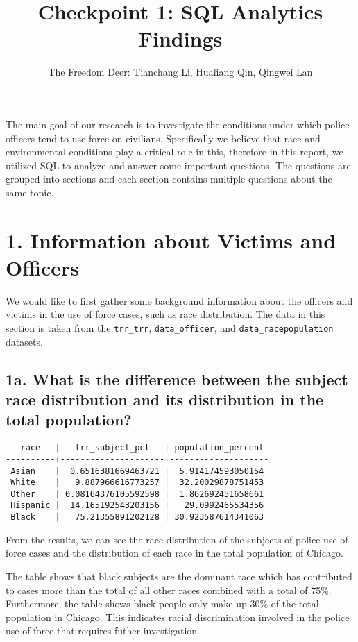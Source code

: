 \documentclass[10pt]{article}
\title{Checkpoint 1: SQL Analytics Findings}
\author{The Freedom Deer: Tianchang Li, Hualiang Qin, Qingwei Lan}
\begin{document}
\maketitle

The main goal of our research is to investigate the conditions under which police officers tend to use force on civilians. Specifically we believe that race and environmental conditions play a critical role in this, therefore in this report, we utilized SQL to analyze and answer some important questions. The questions are grouped into sections and each section contains multiple questions about the same topic.

\section*{1. Information about Victims and Officers}

We would like to first gather some background information about the officers and victims in the use of force cases, such as race distribution. The data in this section is taken from the \texttt{trr\_trr}, \texttt{data\_officer}, and \texttt{data\_racepopulation} datasets.

\subsection*{1a. What is the difference between the subject race distribution and its distribution in the total population?}

\begin{verbatim}
   race   |   trr_subject_pct   | population_percent
----------+---------------------+--------------------
 Asian    |  0.6516381669463721 |  5.914174593050154
 White    |   9.887966616773257 |  32.20029878751453
 Other    | 0.08164376105592598 |  1.862692451658661
 Hispanic |  14.165192543203156 |   29.0992465534356
 Black    |   75.21355891202128 | 30.923587614341063
\end{verbatim}

From the results, we can see the race distribution of the subjects of police use of force cases and the distribution of each race in the total population of Chicago.

The table shows that black subjects are the dominant race which has contributed to cases more than the total of all other races combined with a total of 75\%. Furthermore, the table shows black people only make up 30\% of the total population in Chicago. This indicates racial discrimination involved in the police use of force that requires futher investigation.
\end{document}

